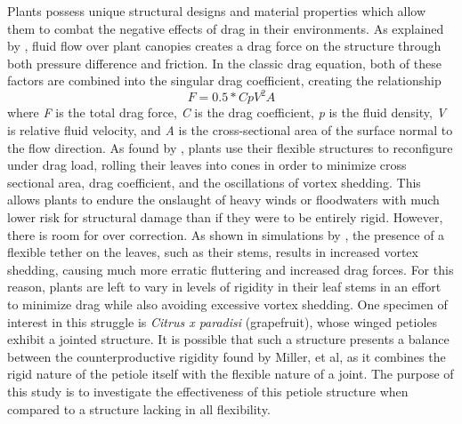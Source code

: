 Plants possess unique structural designs and material properties which allow them to combat the negative effects of drag in their environments. As explained by \citep{delangre,2008}, fluid flow over plant canopies creates a drag force on the structure through both pressure difference and friction. In the classic drag equation, both of these factors are combined into the singular drag coefficient, creating the relationship
\[F=0.5*CpV^2A\]where \textit{F} is the total drag force, \textit{C} is the drag coefficient, \textit{p} is the fluid density, \textit{V} is relative fluid velocity, and \textit{A} is the cross-sectional area of the surface normal to the flow direction. As found by \citep{vogel,1989}, plants use their flexible structures to reconfigure under drag load, rolling their leaves into cones in order to minimize cross sectional area, drag coefficient, and the oscillations of vortex shedding. This allows plants to endure the onslaught of heavy winds or floodwaters with much lower risk for structural damage than if they were to be entirely rigid. 
	However, there is room for over correction. As shown in simulations by \citep{miller, et al,2012}, the presence of a flexible tether on the leaves, such as their stems, results in increased vortex shedding, causing much more erratic fluttering and increased drag forces. For this reason, plants are left to vary in levels of rigidity in their leaf stems in an effort to minimize drag while also avoiding excessive vortex shedding. 
    One specimen of interest in this struggle is \emph{Citrus x paradisi} (grapefruit), whose winged petioles exhibit a jointed structure. It is possible that such a structure presents a balance between the counterproductive rigidity found by Miller, et al, as it combines the rigid nature of the petiole itself with the flexible nature of a joint. The purpose of this study is to investigate the effectiveness of this petiole structure when compared to a structure lacking in all flexibility.

